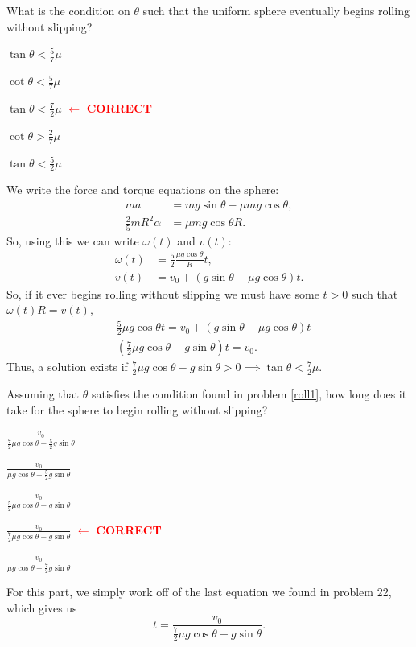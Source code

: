\documentclass[11pt]{scrartcl}
\newcommand{\cor}{\textcolor{red}{$\leftarrow$ \textbf{CORRECT}}}
\begin{document}
\begin{prob}\label{roll1}
    What is the condition on $\theta$ such that the uniform sphere eventually begins rolling without slipping?
    \begin{choices}
        \item $\tan \theta < \frac 57 
        \mu$
        \item $\cot \theta < \frac 57 \mu$
        \item $\tan \theta < \frac 72 \mu$ \cor
        \item $\cot \theta > \frac 27 \mu$
        \item $\tan \theta < \frac 52 \mu$
    \end{choices}
\end{prob}
\begin{sol}
    We write the force and torque equations on the sphere:
    \begin{align*}
        ma &= mg\sin \theta - \mu mg \cos \theta, \\
        \frac 25 mR^2 \alpha &= \mu mg \cos \theta R.
    \end{align*}
    So, using this we can write $\omega(t)$ and $v(t)$:
    \begin{align*}
        \omega(t) &= \frac 52 \frac{\mu g \cos \theta}{R}t,\\
        v(t) &= v_0 + (g\sin \theta - \mu g \cos \theta) t.
    \end{align*}
    So, if it ever begins rolling without slipping we must have some $t> 0 $ such that $\omega(t) R  = v(t)$,
    \begin{align*}
        &\frac 52 \mu g \cos \theta t = v_0 + (g\sin \theta - \mu g \cos \theta)t\\
        &\left(\frac 72 \mu g \cos \theta - g\sin \theta\right) t = v_0.
    \end{align*}
    Thus, a solution exists if $\frac 72 \mu g \cos \theta - g \sin \theta > 0 \implies \tan \theta < \frac 72 \mu$.
\end{sol}

\begin{prob}\label{roll2}
    Assuming that $\theta$ satisfies the condition found in problem \ref{roll1}, how long does it take for the sphere to begin rolling without slipping?
    \begin{choices}
        \item $\frac{v_0}{\frac 72 \mu g \cos \theta - \frac 52g\sin \theta}$
        \item $\frac{v_0}{ \mu g \cos \theta - \frac 52 g\sin \theta}$
        \item $\frac{v_0}{\frac 52 \mu g \cos \theta - g\sin \theta}$
        \item $\frac{v_0}{\frac 72 \mu g \cos \theta - g\sin \theta}$ \cor
        \item $\frac{v_0}{ \mu g \cos \theta - \frac 72 g\sin \theta}$
    \end{choices}
\end{prob}
\begin{sol}
    For this part, we simply work off of the last equation we found in problem 22, which gives us 
    $$t = \frac{v_0}{\frac 72  \mu g \cos \theta - g\sin \theta}.$$
\end{sol}
\end{document}
